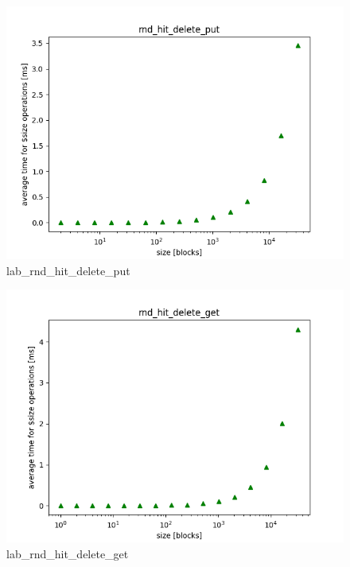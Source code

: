 \documentclass[twocolumn,11pt]{article}
\begin{document}
\begin{figure}[H]
  \includegraphics[width=\linewidth]{Pictures/LABPC/rnd_hit_delete_complete_put.png}
  \caption{lab\_rnd\_hit\_delete\_put}
  \label{fig:lab_rnd_hit_delete_put}
\end{figure}
\begin{figure}[H]
  \includegraphics[width=\linewidth]{Pictures/LABPC/rnd_hit_delete_complete_get.png}
  \caption{lab\_rnd\_hit\_delete\_get}
  \label{fig:lab_rnd_hit_delete_get}
\end{figure}
\end{document}
